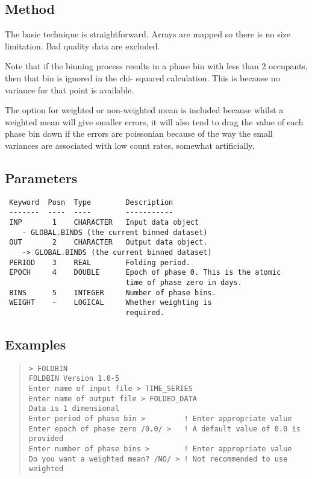 \documentclass{book}
\renewcommand{\_}{{\tt\char'137}}     %
\begin{document}
\subsection{Method}
The basic technique is straightforward. Arrays are mapped so
there is no size limitation. Bad quality data are excluded.

Note that if the binning process results in a phase bin with
less than 2 occupants, then that bin is ignored in the chi-
squared calculation. This is because no variance for that
point is available.

The option for weighted or non-weighted mean is included
because whilst a weighted mean will give smaller errors,
it will also tend to drag the value of each phase bin down
if the errors are poissonian because of the way the small
variances are associated with low count rates, somewhat
artificially.

\subsection{Parameters}
\begin{verbatim}
 Keyword  Posn  Type        Description
 -------  ----  ----        -----------
 INP       1    CHARACTER   Input data object
    - GLOBAL.BINDS (the current binned dataset)
 OUT       2    CHARACTER   Output data object.
    -> GLOBAL.BINDS (the current binned dataset)
 PERIOD    3    REAL        Folding period.
 EPOCH     4    DOUBLE      Epoch of phase 0. This is the atomic
                            time of phase zero in days.
 BINS      5    INTEGER     Number of phase bins.
 WEIGHT    -    LOGICAL     Whether weighting is
                            required.

\end{verbatim}\subsection{Examples}
\begin{quote}\begin{verbatim}
> FOLDBIN
FOLDBIN Version 1.0-5
Enter name of input file > TIME_SERIES
Enter name of output file > FOLDED_DATA
Data is 1 dimensional
Enter period of phase bin >         ! Enter appropriate value
Enter epoch of phase zero /0.0/ >   ! A default value of 0.0 is provided
Enter number of phase bins >        ! Enter appropriate value
Do you want a weighted mean? /NO/ > ! Not recommended to use weighted
\end{verbatim}\end{quote}
\end{document}
